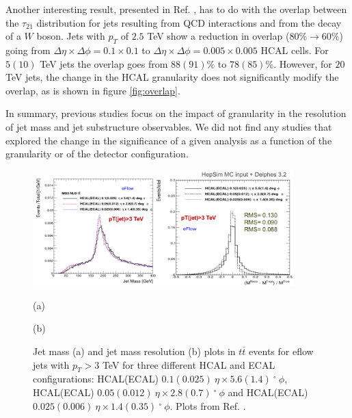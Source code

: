 Another interesting result, presented in Ref. \cite{BOOST2017}, has to do with the overlap between the $\tau_{21}$ distribution for jets resulting from QCD interactions and from the decay of a $W$ boson. Jets with $p_T$ of $2.5$ TeV show a reduction in overlap ($80\%\rightarrow 60\%$) going from $\Delta\eta\times\Delta\phi=0.1\times 0.1$ to $\Delta\eta\times\Delta\phi=0.005\times 0.005$ HCAL cells. For $5(10)$ TeV jets the overlap goes from $88(91)\%$ to $78(85)\%$. However, for $20$ TeV jets, the change in the HCAL granularity does not significantly modify the overlap, as is shown in figure \ref{fig:overlap}. 

In summary, previous studies focus on the impact of granularity in the resolution of jet mass and jet substructure observables. We did not find any studies that explored the change in the significance of a given analysis as a function of the granularity or of the detector configuration.

\begin{figure}
	\centering
	\includegraphics[width=0.9\textwidth]{./Figures/hcal_gran_jet_mass.png}
	\begin{minipage}[t]{0.45\textwidth}
		\caption*{(a)}
	\end{minipage}%
	\hfill
	\begin{minipage}[t]{0.45\textwidth}
		\caption*{(b)}
	\end{minipage}
	\caption{Jet mass (a) and jet mass resolution (b) plots in $t\overline{t}$ events for eflow jets with $p_T>3$ TeV for three different HCAL and ECAL configurations: HCAL(ECAL) $0.1(0.025)~\eta \times 5.6(1.4)~^{\circ}~\phi$, HCAL(ECAL) $0.05(0.012)~\eta \times 2.8(0.7)~^{\circ}~\phi$ and HCAL(ECAL) $0.025(0.006)~\eta \times 1.4(0.35)~^{\circ}~\phi$. Plots from Ref. \cite{BOOST2017}.}
	\label{fig:hcal_gran_jet_mass}
\end{figure}

